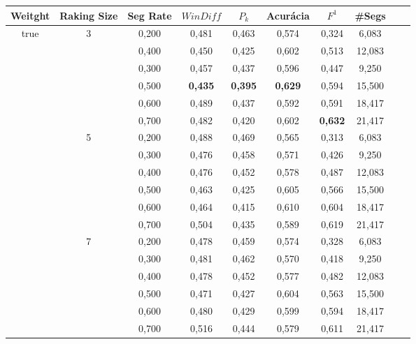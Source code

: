 \documentclass{article}
\begin{document}
\begin{table}[!h]
\center
	\begin{tabular}{|c|c|c|c|c|c|c|c|c|c|} 
\hline 
 Weitght & Raking Size & Seg Rate & $WinDiff$ & $P_k$ & Acurácia & $F^1$ & \#Segs\\ \hline 
 \multirow{18}{*}{true} 
 & \multirow{6}{*}{3} 
	 & 0,200    & 0,481 & 0,463 & 0,574 & 0,324 & 6,083         \\ \cline{3-8}
	&& 0,400    & 0,450 & 0,425 & 0,602 & 0,513 & 12,083        \\ \cline{3-8}
	&& 0,300    & 0,457 & 0,437 & 0,596 & 0,447 & 9,250         \\ \cline{3-8}
	&& 0,500    & \cellcolor{gray!20} \textbf{0,435} & \cellcolor{gray!20} \textbf{0,395} & \cellcolor{gray!20} \textbf{0,629} & 0,594 & 15,500  \\ \cline{3-8}
	&& 0,600    & 0,489 & 0,437 & 0,592 & 0,591 & 18,417        \\ \cline{3-8}
	&& 0,700    & 0,482 & 0,420 & 0,602 & \cellcolor{gray!20} \textbf{0,632} & 21,417  \\\cline{2-8}
 & \multirow{6}{*}{5} 
      & 0,200    & 0,488 & 0,469 & 0,565 & 0,313 & 6,083        \\ \cline{3-8}
     && 0,300    & 0,476 & 0,458 & 0,571 & 0,426 & 9,250        \\ \cline{3-8}
     && 0,400    & 0,476 & 0,452 & 0,578 & 0,487 & 12,083       \\ \cline{3-8}
     && 0,500    & 0,463 & 0,425 & 0,605 & 0,566 & 15,500       \\ \cline{3-8}
     && 0,600    & 0,464 & 0,415 & 0,610 & 0,604 & 18,417       \\ \cline{3-8}
     && 0,700    & 0,504 & 0,435 & 0,589 & 0,619 & 21,417       \\ \cline{2-8}
 & \multirow{6}{*}{7} 
      & 0,200    & 0,478 & 0,459 & 0,574 & 0,328 & 6,083        \\ \cline{3-8}
     && 0,300    & 0,481 & 0,462 & 0,570 & 0,418 & 9,250        \\ \cline{3-8}
     && 0,400    & 0,478 & 0,452 & 0,577 & 0,482 & 12,083       \\ \cline{3-8}
     && 0,500    & 0,471 & 0,427 & 0,604 & 0,563 & 15,500       \\ \cline{3-8}
     && 0,600    & 0,480 & 0,429 & 0,599 & 0,594 & 18,417       \\ \cline{3-8}
     && 0,700    & 0,516 & 0,444 & 0,579 & 0,611 & 21,417       \\ \hline 

\end{tabular}
\end{table}
\end{document}
